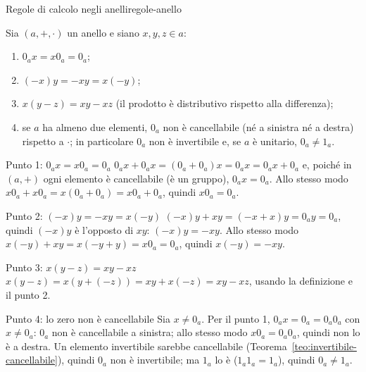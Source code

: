 \begin{concetto}
\begin{Lemma}{Regole di calcolo negli anelli}{regole-anello}
    \begin{prerequisiti}
    \end{prerequisiti}
    Sia $(a, +, \cdot)$ un anello e siano $x, y, z \in a$:
    \begin{enumerate}
        \item $0_a x = x 0_a = 0_a$;
        \item $(-x)y = -xy = x(-y)$;
        \item $x(y - z) = xy - xz$ (il prodotto è distributivo rispetto alla differenza);
        \item se $a$ ha almeno due elementi, $0_a$ non è cancellabile (né a sinistra né a destra) rispetto a $\cdot$; in particolare $0_a$ non è
              invertibile e, se $a$ è unitario, $0_a \neq 1_a$.
    \end{enumerate}
\end{Lemma}
\begin{dimostrazione}
    \begin{caso}{Punto 1: $0_a x = x 0_a = 0_a$}
        $0_a x + 0_a x = (0_a + 0_a) x = 0_a x = 0_a x + 0_a$ e, poiché in $(a, +)$ ogni elemento è cancellabile (è un gruppo), $0_a x = 0_a$.
        Allo stesso modo $x 0_a + x 0_a = x(0_a + 0_a) = x 0_a + 0_a$, quindi $x 0_a = 0_a$.
    \end{caso}
    \begin{caso}{Punto 2: $(-x)y = -xy = x(-y)$}
        $(-x)y + xy = (-x + x)y = 0_a y = 0_a$, quindi $(-x)y$ è l'opposto di $xy$: $(-x)y = -xy$.
        Allo stesso modo $x(-y) + xy = x(-y + y) = x 0_a = 0_a$, quindi $x(-y) = -xy$.
    \end{caso}
    \begin{caso}{Punto 3: $x(y - z) = xy - xz$}
        $x(y - z) = x(y + (-z)) = xy + x(-z) = xy - xz$, usando la definizione e il punto 2.
    \end{caso}
    \begin{caso}{Punto 4: lo zero non è cancellabile}
        Sia $x \neq 0_a$. Per il punto 1, $0_a x = 0_a = 0_a 0_a$ con $x \neq 0_a$: $0_a$ non è cancellabile a sinistra; allo stesso modo $x 0_a = 0_a 0_a$, quindi non lo è
        a destra. Un elemento invertibile sarebbe cancellabile (Teorema~\ref{teo:invertibile-cancellabile}), quindi $0_a$ non è invertibile; ma $1_a$ lo è
        ($1_a 1_a = 1_a$), quindi $0_a \neq 1_a$.
    \end{caso}
\end{dimostrazione}
\end{concetto}

